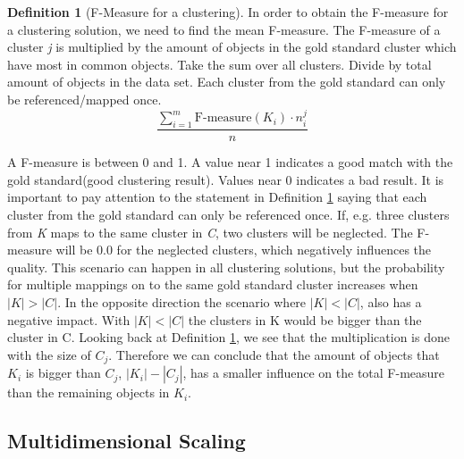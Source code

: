 \documentclass[a4paper,10pt]{article}
\theoremstyle{plain}
\theoremstyle{definition}
\newtheorem{defn}{Definition}
\begin{document}
\begin{defn}[F-Measure for a clustering]\label{def:mean F-measure}
	In order to obtain the F-measure for a clustering solution, we need to find the mean F-measure. The F-measure of a cluster \textit{j} is multiplied by the amount of objects in the gold standard cluster which have most in common objects. Take the sum over all clusters. Divide by total amount of objects in the data set. Each cluster from the gold standard can only be referenced/mapped once.
	\begin{equation}
		\frac{\sum_{i = 1}^{m} \text{F-measure}(K_i) \cdot n_{i}^{j}}{n}
	\end{equation}
\end{defn}
A F-measure is between 0 and 1. A value near 1 indicates a good match with the gold standard(good clustering result). Values near 0 indicates a bad result. It is important to pay attention to the statement in Definition \ref{def:mean F-measure} saying that each cluster from the gold standard can only be referenced once. If, e.g. three clusters from \textit{K} maps to the same cluster in \textit{C}, two clusters will be neglected. The F-measure will be 0.0 for the neglected clusters, which negatively influences the quality. This scenario can happen in all clustering solutions, but the probability for multiple mappings on to the same gold standard cluster increases when $|K|>|C|$. In the opposite direction the scenario where $|K|<|C|$, also has a negative impact. With $|K|<|C|$ the clusters in K would be bigger than the cluster in C. 
Looking back at Definition \ref{def:mean F-measure}, we see that the multiplication is done with the size of $C_j$. Therefore we can conclude that the amount of objects that $K_i$ is bigger than $C_j$, $|K_i|-|C_j|$, has a smaller influence on the total F-measure than the remaining objects in $K_i$.


\subsection{Multidimensional Scaling}

\end{document}
